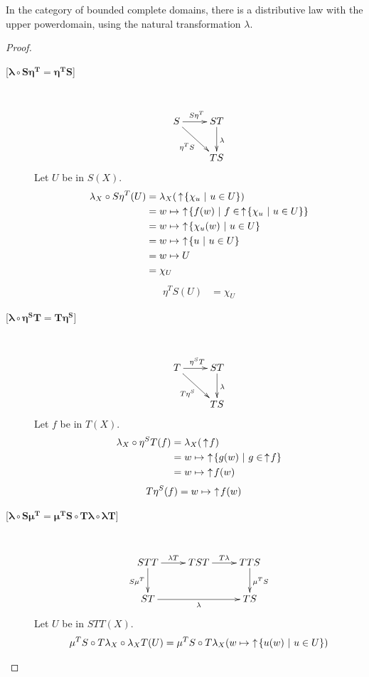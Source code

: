 \begin{proposition}
In the category of bounded complete domains, there is a distributive law with the upper powerdomain, using the natural transformation $\lambda$.
\end{proposition}
\begin{proof}
\begin{description}
\item[{[}$\boldsymbol{\lambda\circ S\eta^T = \eta^T S}${]}] \hfill \\
\[
\xymatrix{
S\ar[r]^{S\eta^T}\ar[dr]_{\eta^T S} & ST\ar[d]^\lambda \\
& TS
}
\]
Let $U$ be in $S(X)$.
\begin{align*}
\lambda_X\circ S \eta^T(U) &= \lambda_X(\,\uparrow\! \{\chi_u\ |\ u\in U\}) \\
&= w\mapsto \,\,\uparrow\! \{f(w)\ |\ f\in \,\uparrow\! \{\chi_u\ |\ u\in U\}\} \\
&= w\mapsto \,\,\uparrow\! \{\chi_u(w)\ |\ u\in U\} \\
&= w\mapsto \,\,\uparrow\! \{u\ |\ u\in U\} \\
&= w\mapsto U \\
&= \chi_U
\end{align*}
\begin{align*}
\eta^T S(U) &= \chi_U
\end{align*}
\item[{[}$\boldsymbol{\lambda\circ \eta^S T = T\eta^S}${]}] \hfill \\
\[
\xymatrix{
T\ar[r]^{\eta^S T}\ar[dr]_{T\eta^S} & ST\ar[d]^\lambda \\
& TS
}
\]
Let $f$ be in $T(X)$.
\begin{align*}
\lambda_X\circ \eta^S T(f) &= \lambda_X(\,\uparrow\! f) \\
&= w\mapsto \,\,\uparrow\! \{g(w)\ |\ g\in \,\uparrow\! f\} \\
&= w\mapsto \,\,\uparrow\! f(w)
\end{align*}
\begin{align*}
T\eta^S(f) &= w\mapsto \,\,\uparrow\! f(w)
\end{align*}
\item[{[}$\boldsymbol{\lambda\circ S\mu^T = \mu^T S\circ T\lambda\circ\lambda T}${]}] \hfill \\
\[
\xymatrix{
STT\ar[r]^{\lambda T}\ar[d]_{S\mu^T} & TST\ar[r]^{T\lambda} & TTS\ar[d]^{\mu^T S} \\
ST\ar[rr]_\lambda & & TS
}
\]
Let $U$ be in $STT(X)$.
\begin{align*}
\mu^T S\circ T\lambda_X \circ \lambda_X T(U) 
&= \mu^T S\circ T\lambda_X(w\mapsto \,\ua \{u(w)\ |\ u\in U\}) \\

\end{align*}
\end{description}
\end{proof}
